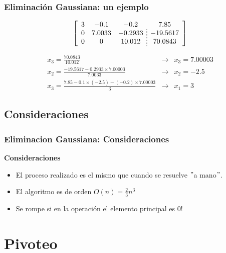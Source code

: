 \documentclass[xcolor=svgnames]{beamer} %
\theoremstyle{plain}
\renewcommand{\textbf}[1]{{\bfseries\textcolor{redUnq2}{#1}}}
\theoremstyle{definition}
\begin{document}
\begin{frame}
\frametitle{Eliminación Gaussiana: un ejemplo}

$$\left[\begin{array}{ccc;{2pt/2pt}c}
 3	& -0.1		& -0.2 		& 7.85\\
 	0	& 7.0033		& -0.2933 	& -19.5617\\
 	0	& 0	 		& 10.012		& 70.0843
\end{array}\right]$$


$$\begin{array}{ccc}
x_3 = \frac{70.0843}{10.012} &\rightarrow& \boxed{x_3=7.00003}\\
x_2 = \frac{-19.5617-0.2933\times 7.00003}{7.0033} &\rightarrow& \boxed{x_2=-2.5}\\
x_3 = \frac{7.85-0.1\times(-2.5)-(-0.2)\times7.00003}{3} &\rightarrow& \boxed{x_1=3}
\end{array}$$

\end{frame}

\subsection{Consideraciones}
\begin{frame}
\frametitle{Eliminacion Gaussiana: Consideraciones}

\textbf{Consideraciones}
\begin{itemize}
\item El proceso realizado es el mismo que cuando se resuelve $"$a mano$"$.
\pause
\item El algoritmo es de orden  $O(n) = \frac{2}{3} n^3$
\pause
\item Se rompe si en la operación el elemento principal es 0!
\end{itemize}
\end{frame}


\section{Pivoteo}
\end{document}
